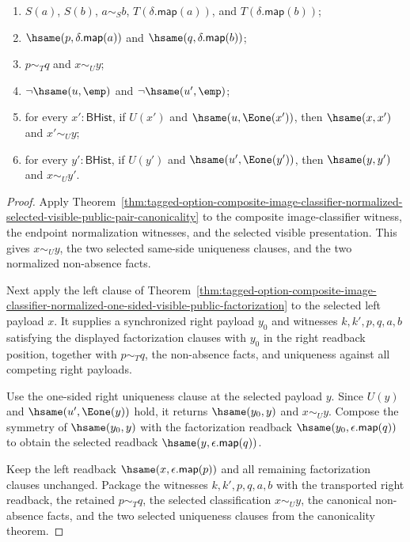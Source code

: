\begin{theorem}
\begin{enumerate}
$\hsame(x,\epsilon.\mathsf{map}(p))$, and
$\hsame(y,\epsilon.\mathsf{map}(q))$;
\item $S(a)$, $S(b)$, $a\sim_S b$, $T(\delta.\mathsf{map}(a))$, and
$T(\delta.\mathsf{map}(b))$;
\item $\hsame(p,\delta.\mathsf{map}(a))$ and
$\hsame(q,\delta.\mathsf{map}(b))$;
\item $p\sim_T q$ and $x\sim_U y$;
\item $\neg\hsame(u,\emp)$ and $\neg\hsame(u',\emp)$;
\item for every $x':\mathsf{BHist}$, if $U(x')$ and
$\hsame(u,\Eone(x'))$, then $\hsame(x,x')$ and $x'\sim_U y$;
\item for every $y':\mathsf{BHist}$, if $U(y')$ and
$\hsame(u',\Eone(y'))$, then $\hsame(y,y')$ and $x\sim_U y'$.
\end{enumerate}
\end{theorem}
\begin{proof}
Apply
Theorem~\ref{thm:tagged-option-composite-image-classifier-normalized-selected-visible-public-pair-canonicality}
to the composite image-classifier witness, the endpoint normalization witnesses,
and the selected visible presentation. This gives $x\sim_U y$, the two
selected same-side uniqueness clauses, and the two normalized non-absence
facts.

Next apply the left clause of
Theorem~\ref{thm:tagged-option-composite-image-classifier-normalized-one-sided-visible-public-factorization}
to the selected left payload $x$. It supplies a synchronized right payload
$y_0$ and witnesses $k,k',p,q,a,b$ satisfying the displayed factorization
clauses with $y_0$ in the right readback position, together with $p\sim_T q$,
the non-absence facts, and uniqueness against all competing right payloads.

Use the one-sided right uniqueness clause at the selected payload $y$. Since
$U(y)$ and $\hsame(u',\Eone(y))$ hold, it returns $\hsame(y_0,y)$ and
$x\sim_U y$. Compose the symmetry of $\hsame(y_0,y)$ with the factorization
readback $\hsame(y_0,\epsilon.\mathsf{map}(q))$ to obtain the selected readback
$\hsame(y,\epsilon.\mathsf{map}(q))$.

Keep the left readback $\hsame(x,\epsilon.\mathsf{map}(p))$ and all remaining
factorization clauses unchanged. Package the witnesses $k,k',p,q,a,b$ with the
transported right readback, the retained $p\sim_T q$, the selected
classification $x\sim_U y$, the canonical non-absence facts, and the two
selected uniqueness clauses from the canonicality theorem.
\end{proof}

